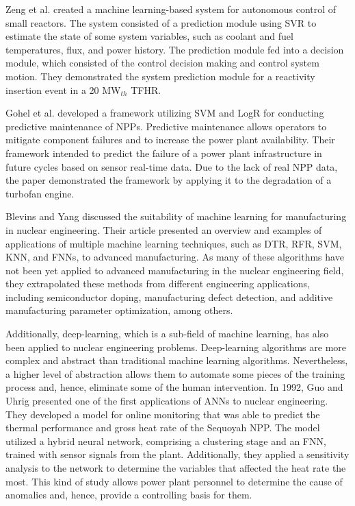 Zeng et al. \cite{zeng_machine_2017} created a machine learning-based system for autonomous control of small reactors.
The system consisted of a prediction module using \gls*{SVR} to estimate the state of some system variables, such as coolant and fuel temperatures, flux, and power history.
The prediction module fed into a decision module, which consisted of the control decision making and control system motion.
They demonstrated the system prediction module for a reactivity insertion event in a 20 MW$_{th}$ \gls*{TFHR}.

Gohel et al. \cite{gohel_predictive_2020} developed a framework utilizing \gls*{SVM} and \gls*{LogR} for conducting predictive maintenance of \glspl*{NPP}.
Predictive maintenance allows operators to mitigate component failures and to increase the power plant availability.
Their framework intended to predict the failure of a power plant infrastructure in future cycles based on sensor real-time data.
Due to the lack of real NPP data, the paper demonstrated the framework by applying it to the degradation of a turbofan engine.

Blevins and Yang \cite{blevins_machine_2020} discussed the suitability of machine learning for manufacturing in nuclear engineering.
Their article presented an overview and examples of applications of multiple machine learning techniques, such as \gls*{DTR}, \gls*{RFR}, \gls*{SVM}, \gls*{KNN}, and \glspl*{FNN}, to advanced manufacturing.
As many of these algorithms have not been yet applied to advanced manufacturing in the nuclear engineering field, they extrapolated these methods from different engineering applications, including semiconductor doping, manufacturing defect detection, and additive manufacturing parameter optimization, among others.

Additionally, deep-learning, which is a sub-field of machine learning, has also been applied to nuclear engineering problems.
Deep-learning algorithms are more complex and abstract than traditional machine learning algorithms.
Nevertheless, a higher level of abstraction allows them to automate some pieces of the training process and, hence, eliminate some of the human intervention.
In 1992, Guo and Uhrig \cite{guo_use_1992} presented one of the first applications of \glspl*{ANN} to nuclear engineering.
They developed a model for online monitoring that was able to predict the thermal performance and gross heat rate of the Sequoyah \gls*{NPP}.
The model utilized a hybrid neural network, comprising a clustering stage and an \gls*{FNN}, trained with sensor signals from the plant.
Additionally, they applied a sensitivity analysis to the network to determine the variables that affected the heat rate the most.
This kind of study allows power plant personnel to determine the cause of anomalies and, hence, provide a controlling basis for them.

